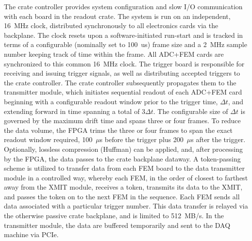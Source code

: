 \documentclass[a4paper,fleqn,longmktitle]{cas-dc}
\begin{document}
The crate controller provides system configuration and slow I/O communication with each board in the readout crate. The system is run on an independent, 16~MHz clock, distributed synchronously to all electronics cards via the backplane. The clock resets upon a software-initiated run-start and is tracked in terms of a configurable (nominally set to 100~us) frame size and a 2~MHz sample number keeping track of time within the frame. All ADC+FEM cards are synchronized to this common 16~MHz clock. The trigger board is responsible for receiving and issuing trigger signals, as well as distributing accepted triggers to the crate controller. The crate controller subsequently propagates them to the transmitter module, which initiates sequential readout of each ADC+FEM card beginning with a configurable readout window prior to the trigger time, $\Delta t$, and extending forward in time spanning a total of 3$\Delta t$. The configurable size of $\Delta t$ is governed by the maximum drift time and spans three or four frames. To reduce the data volume, the FPGA trims the three or four frames to span the exact readout window required, 100~$\mu$s before the trigger plus 200~$\mu$s after the trigger. Optionally, lossless compression (Huffman) can be applied, and, after processing by the FPGA, the data passes to the crate backplane dataway. A token-passing scheme is utilized to transfer data from each FEM board to the data transmitter module in a controlled way, whereby each FEM, in the order of closest to farthest away from the XMIT module, receives a token, transmits its data to the XMIT, and passes the token on to the next FEM in the sequence. Each FEM sends all data associated with a particular trigger number. This data transfer is relayed via the otherwise passive crate backplane, and is limited to 512~MB/s. In the transmitter module, the data are buffered temporarily and sent to the DAQ machine via PCIe.
\end{document}
